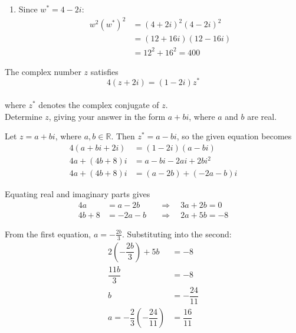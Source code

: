 \documentclass[leqno]{article}
\begin{document}
\begin{enumerate}[
  label=\textbf{\arabic*.},
  leftmargin=*,
  topsep=0pt,
  partopsep=0pt,
  parsep=0pt
]
\begin{djsSolution}
\begin{enumerate}[label=\textbf{(\alph*)}, start=1]
\begin{enumerate}[label=(\roman*), start=1]
Multiplying the first equation by \(2\) and the second by \(5\), then adding, eliminates \(w^*\):
\begin{align*}
-21w&=-84-42i\\
w&=4+2i
\end{align*}

This is in the form \(a+bi\) with \(a=4\), \(b=2\).

\item Since \(w^*=4-2i\):
\begin{align*}
w^2(w^*)^2&=(4+2i)^2(4-2i)^2\\
&=(12+16i)(12-16i)\\
&=12^2+16^2=400
\end{align*}

\end{enumerate}
\end{enumerate}
\end{djsSolution}

\newpage

\questionitem

The complex number $z$ satisfies
\[
4(z+2i)=(1-2i)z^*
\] \\
where $z^*$ denotes the complex conjugate of $z$. \\
Determine $z$, giving your answer in the form $a+bi$, where $a$ and $b$ are real.  \\

\vspace*{10pt}

\begin{djsSolution}
Let \(z=a+bi\), where \(a,b\in\mathbb{R}\). Then \(z^*=a-bi\), so the given equation becomes
\begin{align*}
4(a+bi+2i)&=(1-2i)(a-bi)\\
4a+(4b+8)i&=a-bi-2ai+2bi^2\\
4a+(4b+8)i&=(a-2b)+(-2a-b)i
\end{align*}

Equating real and imaginary parts gives
\begin{align*}
4a&=a-2b &&\Longrightarrow\quad 3a+2b=0\\
4b+8&=-2a-b &&\Longrightarrow\quad 2a+5b=-8
\end{align*}

From the first equation, \(a=-\frac{2b}{3}\). Substituting into the second:
\begin{align*}
2\left(-\dfrac{2b}{3}\right)+5b&=-8\\
\dfrac{11b}{3}&=-8\\
b&=-\dfrac{24}{11}\\
a=-\dfrac{2}{3}\left(-\dfrac{24}{11}\right)&=\dfrac{16}{11}
\end{align*}


\end{djsSolution}
\end{enumerate}
\end{document}
